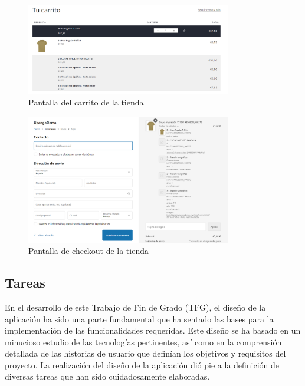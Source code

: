 \documentclass[12pt]{article}
\begin{document}
\begin{figure}[ht]
    \centering
    \includegraphics[width=0.8\textwidth]{imagenes/ManualUsuario/PantallaCarrito.png}
    \caption{\label{fig:Carrito}Pantalla del carrito de la tienda}
    \vspace{\fill}
\end{figure}

\begin{figure}[ht]
    \centering
    \includegraphics[width=0.8\textwidth]{imagenes/ManualUsuario/ImagenCheckout.png}
    \caption{\label{fig:Checkout}Pantalla de checkout de la tienda}
    \vspace{\fill}
\end{figure}

\clearpage
\subsection{Tareas}\label{sec:tareas}

En el desarrollo de este Trabajo de Fin de Grado (TFG), el diseño de la aplicación ha sido una parte fundamental que ha sentado las bases para la implementación
de las funcionalidades requeridas. Este diseño se ha basado en un minucioso estudio de las tecnologías pertinentes, así como en la comprensión detallada de las
historias de usuario que definían los objetivos y requisitos del proyecto. La realización del diseño de la aplicación dió pie a la definición de diversas tareas que han sido cuidadosamente 
elaboradas.
\end{document}
